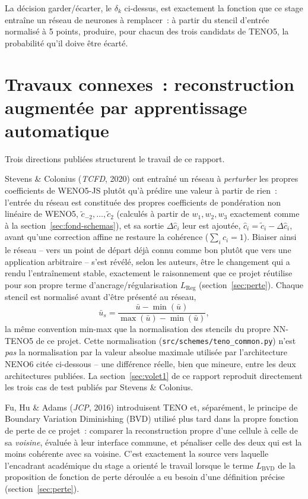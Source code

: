 \documentclass[11pt]{article}
\begin{document}
La décision garder/écarter, le $\delta_k$ ci-dessus, est exactement la
fonction que ce stage entraîne un réseau de neurones à remplacer~: à
partir du stencil d'entrée normalisé à 5 points, produire, pour chacun
des trois candidats de TENO5, la probabilité qu'il doive être écarté.

\section{Travaux connexes~: reconstruction augmentée par apprentissage automatique}

Trois directions publiées structurent le travail de ce rapport.

Stevens \& Colonius (\emph{TCFD}, 2020) ont entraîné un réseau à
\emph{perturber} les propres coefficients de WENO5-JS plutôt qu'à prédire
une valeur à partir de rien~: l'entrée du réseau est constituée des
propres coefficients de pondération non linéaire de WENO5,
$\tilde c_{-2},\dots,\tilde c_2$ (calculés à partir de $w_1,w_2,w_3$
exactement comme à la section~\ref{sec:fond-schemas}), et sa sortie
$\Delta\hat c_i$ leur est ajoutée, $\hat c_i = \tilde c_i - \Delta\hat
c_i$, avant qu'une correction affine ne restaure la cohérence
($\sum_i c_i = 1$). Biaiser ainsi le réseau -- vers un point de départ
déjà connu comme bon plutôt que vers une application arbitraire -- s'est
révélé, selon les auteurs, être le changement qui a rendu l'entraînement
stable, exactement le raisonnement que ce projet réutilise pour son
propre terme d'ancrage/régularisation $L_{\text{Reg}}$
(section~\ref{sec:perte}). Chaque stencil est normalisé avant d'être
présenté au réseau,
\[
\bar u_s = \frac{\bar u - \min(\bar u)}{\max(\bar u) - \min(\bar u)},
\]
la même convention min-max que la normalisation des stencils du propre
NN-TENO5 de ce projet. Cette normalisation
(\texttt{src/schemes/teno\_common.py}) n'est \emph{pas} la normalisation
par la valeur absolue maximale utilisée par l'architecture NENO6 citée
ci-dessous -- une différence réelle, bien que mineure, entre les deux
architectures publiées. La section~\ref{sec:volet1} de ce rapport
reproduit directement les trois cas de test publiés par Stevens \&
Colonius.

Fu, Hu \& Adams (\emph{JCP}, 2016) introduisent TENO et, séparément, le
principe de Boundary Variation Diminishing (BVD) utilisé plus tard dans la
propre fonction de perte de ce projet~: comparer la reconstruction propre
d'une cellule à celle de sa \emph{voisine}, évaluée à leur interface
commune, et pénaliser celle des deux qui est la moins cohérente avec sa
voisine. C'est exactement la source vers laquelle l'encadrant académique
du stage a orienté le travail lorsque le terme $L_{\text{BVD}}$ de la
proposition de fonction de perte déroulée a eu besoin d'une définition
précise (section~\ref{sec:perte}).
\end{document}
